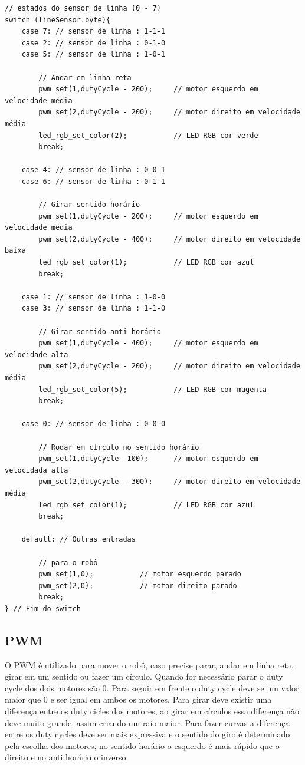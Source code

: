 \documentclass{article}
\begin{document}
\begin{lstlisting}[style = Matlab-editor, language = C2]          
// estados do sensor de linha (0 - 7)
switch (lineSensor.byte){
    case 7: // sensor de linha : 1-1-1
    case 2: // sensor de linha : 0-1-0
    case 5: // sensor de linha : 1-0-1
                            
        // Andar em linha reta
        pwm_set(1,dutyCycle - 200);     // motor esquerdo em velocidade média
        pwm_set(2,dutyCycle - 200);     // motor direito em velocidade média
        led_rgb_set_color(2);           // LED RGB cor verde
        break;

    case 4: // sensor de linha : 0-0-1               
    case 6: // sensor de linha : 0-1-1
                            
        // Girar sentido horário
        pwm_set(1,dutyCycle - 200);     // motor esquerdo em velocidade média
        pwm_set(2,dutyCycle - 400);     // motor direito em velocidade baixa
        led_rgb_set_color(1);           // LED RGB cor azul
        break;

    case 1: // sensor de linha : 1-0-0
    case 3: // sensor de linha : 1-1-0
                            
        // Girar sentido anti horário
        pwm_set(1,dutyCycle - 400);     // motor esquerdo em velocidade alta 
        pwm_set(2,dutyCycle - 200);     // motor direito em velocidade média
        led_rgb_set_color(5);           // LED RGB cor magenta
        break;

    case 0: // sensor de linha : 0-0-0
                            
        // Rodar em círculo no sentido horário
        pwm_set(1,dutyCycle -100);      // motor esquerdo em velocidada alta
        pwm_set(2,dutyCycle - 300);     // motor direito em velocidade média
        led_rgb_set_color(1);           // LED RGB cor azul
        break;

    default: // Outras entradas
                            
        // para o robô
        pwm_set(1,0);           // motor esquerdo parado
        pwm_set(2,0);           // motor direito parado
        break;
} // Fim do switch
\end{lstlisting}

\subsection{PWM}
O PWM é utilizado para mover o robô, caso precise parar, andar em linha reta, girar em um sentido ou fazer um círculo. Quando for necessário parar o duty cycle dos dois motores são 0. Para seguir em frente o duty cycle deve se um valor maior que 0 e ser igual em ambos os motores. Para girar deve existir uma diferença entre os duty cicles dos motores, ao girar em círculos essa diferença não deve muito grande, assim criando um raio maior. Para fazer curvas a diferença entre os duty cycles deve ser mais expressiva e o sentido do giro é determinado pela escolha dos motores, no sentido horário o esquerdo é mais rápido que o direito e no anti horário o inverso.\par
\end{document}

